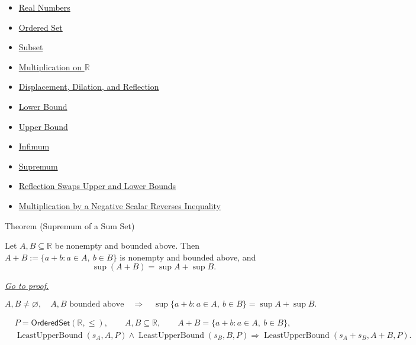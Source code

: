 \begin{dependencies}
\begin{itemize}
  \item \hyperref[def:reals]{Real Numbers}
  \item \hyperref[def:ordered-set]{Ordered Set}
  \item \hyperref[def:subset]{Subset}
  \item \hyperref[def:multiplication-on-r]{Multiplication on $\mathbb{R}$}
  \item \hyperref[def:displacement-dilation-reflection]{Displacement, Dilation, and Reflection}
  \item \hyperref[def:real-lower-bound]{Lower Bound}
  \item \hyperref[def:real-upper-bound]{Upper Bound}
  \item \hyperref[def:infimum]{Infimum}
  \item \hyperref[def:supremum]{Supremum}
  \item \hyperref[cor:reflection-swaps-upper-lower-bounds]{Reflection Swaps Upper and Lower Bounds}
  \item \hyperref[thm:ineq-multiply-negative]{Multiplication by a Negative Scalar Reverses Inequality}
\end{itemize}
\end{dependencies}





\begin{theorembox}{Theorem (Supremum of a Sum Set)}
\begin{theorem}
\label{thm:supremum-sum-set}
Let $A,B\subseteq\mathbb{R}$ be nonempty and bounded above.  Then
$A+B:=\{a+b:a\in A,\ b\in B\}$ is nonempty and bounded above, and
\[
  \sup(A+B)=\sup A+\sup B.
\]

\smallskip
\noindent
\hyperref[prf:supremum-sum-set]{\textit{Go to proof.}}
\end{theorem}
\end{theorembox}

\begin{remark*}
\[
A,B\neq\varnothing,\quad A,B\text{ bounded above}
\quad\Longrightarrow\quad
\sup\{a+b:a\in A,\ b\in B\}=\sup A+\sup B.
\]
\end{remark*}

\begin{remark*}
\[
\begin{aligned}
&P=\mathsf{OrderedSet}(\mathbb{R},\leq),\qquad A,B\subseteq\mathbb{R},\qquad A+B=\{a+b:a\in A,\ b\in B\},\\
&\operatorname{LeastUpperBound}(s_A,A,P)\land \operatorname{LeastUpperBound}(s_B,B,P)
\Longrightarrow
\operatorname{LeastUpperBound}(s_A+s_B,A+B,P).
\end{aligned}
\]
\end{remark*}

